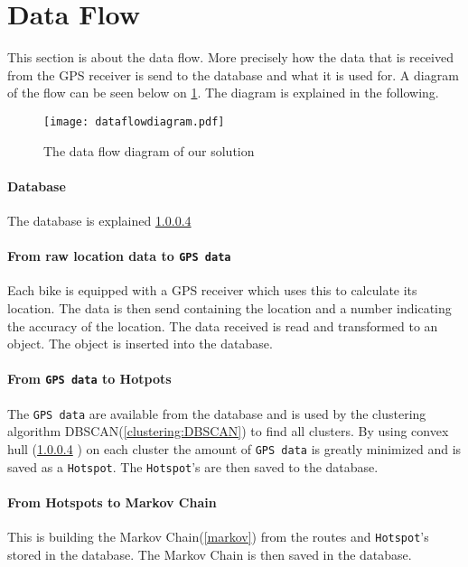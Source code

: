 \section{Data Flow}
This section is about the data flow. More precisely how the data that is received from the GPS receiver is send to the database and what it is used for.
A diagram of the flow can be seen below on \cref{fig:dataFlowDiagram}.
The diagram is explained in the following.

\begin{figure}[H]
\texttt{[image: dataflowdiagram.pdf]}
\caption{The data flow diagram of our solution}
\label{fig:dataFlowDiagram}
\end{figure}
\pagebreak 

\paragraph{Database}
The database is explained \cref{} 

\paragraph{From raw location data to \texttt{GPS data}}
Each bike is equipped with a GPS receiver which uses this to calculate its location.
The data is then send containing the location and a number indicating the accuracy of the location.
The data received is read and transformed to an object.
The object is inserted into the database.

\paragraph{From \texttt{GPS data} to Hotpots}
The \texttt{GPS data} are available from the database and is used by the clustering algorithm DBSCAN(\cref{clustering:DBSCAN}) to find all clusters.
By using convex hull (\cref{} ) on each cluster the amount of \texttt{GPS data} is greatly minimized and is saved as a \texttt{Hotspot}.
The \texttt{Hotspot}'s are then saved to the database.

\paragraph{From Hotspots to Markov Chain}
This is building the Markov Chain(\cref{markov}) from the routes and \texttt{Hotspot}'s stored in the database.
The Markov Chain is then saved in the database.